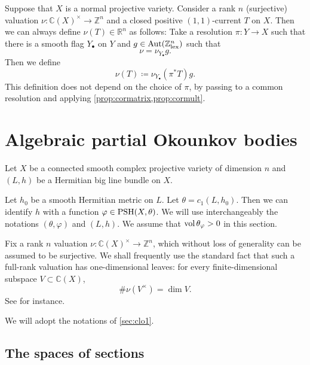 \begin{remark}\label{rmk:valcurr}
    Suppose that $X$ is a normal projective variety. Consider a rank $n$ (surjective) valuation $\nu\colon \mathbb{C}(X)^{\times}\rightarrow \mathbb{Z}^n$ and a closed positive $(1,1)$-current $T$ on $X$. Then we can always define $\nu(T)\in \mathbb{R}^n$ as follows: Take a resolution $\pi\colon Y\rightarrow X$ such that there is a smooth flag $Y_{\bullet}$ on $Y$ and $g\in \operatorname{Aut}(\mathbb{Z}^n_{\mathrm{lex}})$ such that
    \[
    \nu=\nu_{Y_{\bullet}}g.
    \]
    Then we define
    \[
    \nu(T)\coloneqq \nu_{Y_{\bullet}}(\pi^*T)g.
    \]
    This definition does not depend on the choice of $\pi$, by passing to a common resolution and applying \cref{prop:cormatrix,prop:cormult}.
\end{remark}

\section{Algebraic partial Okounkov bodies}\label{sec:PoB}
Let $X$ be a connected smooth complex projective variety of dimension $n$ and $(L,h)$ be a Hermitian big line bundle on $X$.

Let $h_0$ be a smooth Hermitian metric on $L$. Let $\theta=c_1(L,h_0)$. Then we can identify $h$ with a function $\varphi\in \mathrm{PSH}(X,\theta)$.
We will use interchangeably the notations $(\theta,\varphi)$ and $(L,h)$. We assume that $\operatorname{vol} \theta_{\varphi}>0$ in this section.

Fix a rank $n$ valuation $\nu\colon \mathbb{C}(X)^{\times}\rightarrow \mathbb{Z}^n$, which without loss of generality can be assumed to be surjective. We shall frequently use the standard fact that such a full-rank valuation has one-dimensional leaves: for every finite-dimensional subspace $V\subset \mathbb C(X)$,
\[
    \#\nu(V^\times)=\dim V.
\]
See \cite[Lemma~1.3]{LM09} for instance.

We will adopt the notations of \cref{sec:clo1}.

\subsection{The spaces of sections}
\label{subsec:section_spaces}

